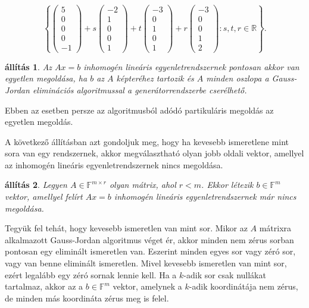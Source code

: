 \documentclass[9pt, showtrims]{memoir}
\makeatletter
\renewenvironment{proof}[1][\proofname]
    {\par\pushQED{\qed}%
    \normalfont \topsep6\p@\@plus6\p@\relax
    \trivlist
    \item[\hskip\labelsep
        \itshape
    #1\@addpunct{:}]\ignorespaces}
    {\popQED\endtrivlist\@endpefalse}
\theoremstyle{plain}
\newtheorem{proposition}{állítás}[section]
\theoremstyle{remark}
\theoremstyle{definition}
\makeatother
\begin{document}
\[
    \left\{
        \begin{pmatrix}
            5\\0\\0\\0\\-1
        \end{pmatrix}
        +s
        \begin{pmatrix}
            -2\\1\\0\\0\\1
        \end{pmatrix}
        +t
        \begin{pmatrix}
            -3\\0\\1\\0\\1
        \end{pmatrix}
        +r
        \begin{pmatrix}
            -3\\0\\0\\1\\2
        \end{pmatrix}
        :s,t,r\in\mathbb{R}
    \right\}.
\]
\begin{proposition}
    Az $Ax=b$ inhomogén lineáris egyenletrendszernek pontosan akkor van egyetlen 
    megoldása, ha $b$ az $A$ képteréhez tartozik és $A$ minden oszlopa a Gauss-Jordan eliminációs algoritmussal a generátorrendszerbe cserélhető.
\end{proposition}
Ebben az esetben persze az algoritmusból adódó partikuláris megoldás az egyetlen megoldás.

A következő állításban azt gondoljuk meg, hogy ha kevesebb ismeretlene mint sora van egy rendszernek, akkor megválasztható olyan jobb oldali vektor, amellyel az inhomogén lineáris egyenletrendszernek nincs megoldása.
\begin{proposition}
    Legyen $A\in\mathbb{F}^{m\times r}$ olyan mátrix, ahol $r<m$.
    Ekkor létezik $b\in\mathbb{F}^m$ vektor, 
    amellyel felírt $Ax=b$ inhomogén lineáris egyenletrendszernek már nincs megoldása.
\end{proposition}
\begin{proof}
    Tegyük fel tehát, hogy kevesebb ismeretlen van mint sor.
    Mikor az $A$ mátrixra alkalmazott Gauss-Jordan algoritmus véget ér, 
    akkor minden nem zérus sorban pontosan egy eliminált ismeretlen van.
    Eszerint minden egyes sor vagy zéró sor, 
    vagy van benne eliminált ismeretlen.
    Mivel kevesebb ismeretlen van mint sor, 
    ezért legalább egy zéró sornak lennie kell.
    Ha a $k$-adik sor csak nullákat tartalmaz, akkor az a $b\in\mathbb{F}^m$ vektor,
    amelynek a $k$-adik koordinátája nem zérus, de minden más koordináta zérus meg is felel.
\end{proof}
\end{document}
